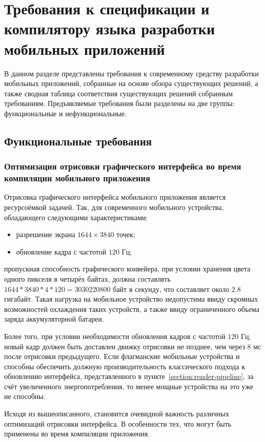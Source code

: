 \section{Требования к спецификации и компилятору языка разработки мобильных приложений}
\label{requirements-section}
В данном разделе представлены требования к современному средству
разработки мобильных приложений, собранные на основе обзора существующих
решений, а также сводная таблица соответствия существующих решений собранным
требованиям. Предъявляемые требования были разделены на две группы:
функциональные и нефункциональные.


\subsection{Функциональные требования}
\subsubsection*{Оптимизация отрисовки графического интерфейса во время компиляции мобильного приложения}
Отрисовка графического интерфейса мобильного приложения является
ресурсоёмкой задачей. Так, для современного мобильного устройства,
обладающего следующими характеристиками:
\begin{itemize}
	\item разрешение экрана $1644 \times 3840$ точек;
	\item обновление кадра с частотой $120$ Гц;
\end{itemize}
пропускная способность графического конвейера, при условии хранения цвета
одного пикселя в четырёх байтах, должна составлять\\$1644 * 3840 * 4 * 120 = 3030220800$
байт в секунду, что составляет около $2.8$ гигабайт. Такая
нагрузка на мобильное устройство недопустима ввиду скромных возможностей
охлаждения таких устройств, а также ввиду ограниченного объема заряда
аккумуляторной батареи.

Более того, при условии необходимости обновления кадров с частотой $120$ Гц,
новый кадр должен быть доставлен движку отрисовки не позднее, чем через
$8$ мс после отрисовки предыдущего. Если флагманские мобильные устройства
и способны обеспечить должную производительность классического подхода к
обновлению интерфейса, представленного в пункте~\ref{section:render-pipeline},
за счёт увеличенного энергопотребления, то менее мощные устройства на это
уже не способны.

Исходя из вышеописанного, становится очевидной важность
различных оптимизаций отрисовки интерфейса. В особенности тех, что
могут быть применены во время компиляции приложения.

